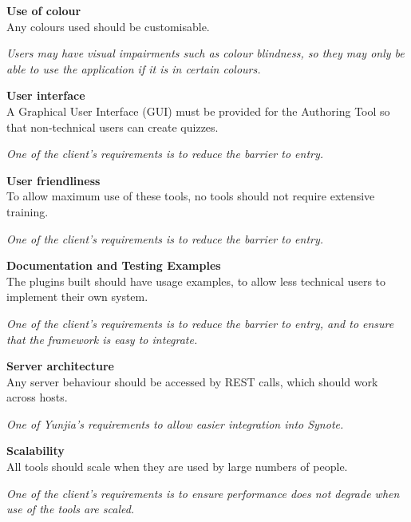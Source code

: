 \begin{requirement}[label=\textbf{N\arabic*}]
	\item \textbf{Use of colour}\label{Req:Use of colour} \hfill \\ 
		Any colours used should be customisable.

		\textit{Users may have visual impairments such as colour blindness, so they may only be able to use the application if it is in certain colours.}

	\item \textbf{User interface} \label{Req:User interface} \hfill \\ 
		A Graphical User Interface (GUI) must be provided for the Authoring Tool so that non-technical users can create quizzes.

		\textit{One of the client's requirements is to reduce the barrier to entry.}

	\item \textbf{User friendliness} \label{Req:User friendliness} \hfill \\ 
		To allow maximum use of these tools, no tools should not require extensive training.

		\textit{One of the client's requirements is to reduce the barrier to entry.}

	\item \textbf{Documentation and Testing Examples} \label{Req:Documentation} \hfill \\ 
		The plugins built should have usage examples, to allow less technical users to implement their own system.

		\textit{One of the client's requirements is to reduce the barrier to entry, and to ensure that the framework is easy to integrate.}

	\item \textbf{Server architecture} \label{Req:Server architecture} \hfill \\ 
		Any server behaviour should be accessed by \gls{REST} calls, which should work across hosts.

		\textit{One of Yunjia's requirements to allow easier integration into Synote.}

	\item \textbf{Scalability} \label{Req:Scalability} \hfill \\ 
		All tools should scale when they are used by large numbers of people.

		\textit{One of the client's requirements is to ensure performance does not degrade when use of the tools are scaled.}
\end{requirement}

